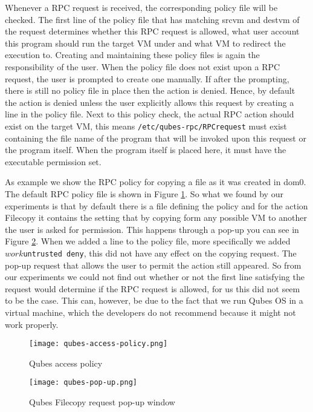 \documentclass[runningheads,a4paper]{article}
\begin{document}
Whenever a RPC request is received, the corresponding policy file will
be checked. The first line of the policy file that has matching srcvm
and destvm of the request determines whether this RPC request is
allowed, what user account this program should run the target VM under
and what VM to redirect the execution to. Creating and maintaining
these policy files is again the responsibility of the user. When the
policy file does not exist upon a RPC request, the user is prompted to
create one manually. If after the prompting, there is still no policy
file in place then the action is denied. Hence, by default the action
is denied unless the user explicitly allows this request by creating
a line in the policy file. Next to this policy check,
the actual RPC action should exist on the target VM, this means
\texttt{/etc/qubes-rpc/RPCrequest} must exist containing the file name
of the program that will be invoked upon this request or the
program itself. When the program itself is placed here, it must have
the executable permission set. %

As example we show the RPC policy for copying a file as it was created
in dom0. The default RPC policy file is shown in Figure \ref{fig:policy}. 
So what we found by our experiments is that by default there is a file defining the policy and for the action Filecopy it contains the setting that by copying form any possible VM to another the user is asked for permission. This happens through a pop-up you can see in Figure \ref{fig:pop-up}. When we added a line to the policy file, more specifically we added \texttt{$work $untrusted deny}, this did not have any effect on the copying request. The pop-up request that allows the user to permit the action still appeared. So from our experiments we could not find out whether or not the first line satisfying the request would determine if the RPC request is allowed, for us this did not seem to be the case. This can, however, be due to the fact that we run Qubes OS in a virtual machine, which the developers do not recommend because it might not work properly.

\begin{figure}[h]
  \centering
  \texttt{[image: qubes-access-policy.png]}
  \caption{Qubes access policy}
  \label{fig:policy}
\end{figure}
\begin{figure}[h]
  \centering
  \texttt{[image: qubes-pop-up.png]}
  \caption{Qubes Filecopy request pop-up window}
  \label{fig:pop-up}
\end{figure}
\end{document}
